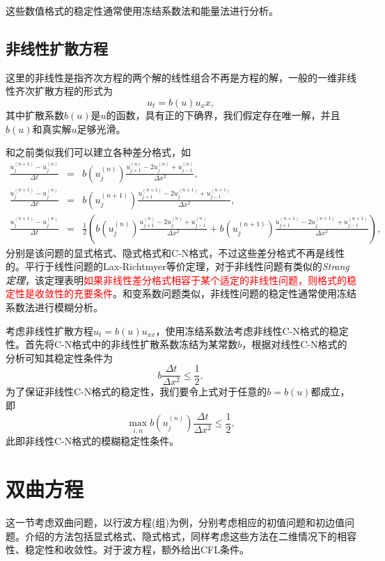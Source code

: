 \documentclass[a4paper,10pt]{ctexart}
\begin{document}
这些数值格式的稳定性通常使用冻结系数法和能量法进行分析。

\subsection{非线性扩散方程}
这里的非线性是指齐次方程的两个解的线性组合不再是方程的解，一般的一维非线性齐次扩散方程的形式为
\begin{equation}
    u_t = b(u)u_xx,
\end{equation}
其中扩散系数$ b(u) $是$ u $的函数，具有正的下确界，我们假定存在唯一解，并且$ b(u) $和真实解$ u $足够光滑。

和之前类似我们可以建立各种差分格式，如
\begin{eqnarray}
    \frac{u^{(n+1)}_j-u^{(n)}_j}{\Delta t} &=& b(u^{(n)}_j)\frac{u^{(n)}_{j+1}-2u^{(n)}_j+u^{(n)}_{j-1}}{\Delta x^2},\\
    \frac{u^{(n+1)}_j-u^{(n)}_j}{\Delta t} &=& b(u^{(n+1)}_j)\frac{u^{(n+1)}_{j+1}-2u^{(n+1)}_j+u^{(n+1)}_{j-1}}{\Delta x^2},\\
    \frac{u^{(n+1)}_j-u^{(n)}_j}{\Delta t} &=& \frac{1}{2}\left( b(u^{(n)}_j)\frac{u^{(n)}_{j+1}-2u^{(n)}_j+u^{(n)}_{j-1}}{\Delta x^2} + b(u^{(n+1)}_j)\frac{u^{(n+1)}_{j+1}-2u^{(n+1)}_j+u^{(n+1)}_{j-1}}{\Delta x^2} \right),
\end{eqnarray}
分别是该问题的显式格式、隐式格式和C-N格式，不过这些差分格式不再是线性的。平行于线性问题的Lax-Richtmyer等价定理，对于非线性问题有类似的\emph{Strang定理}，该定理表明\textcolor{red}{如果非线性差分格式相容于某个适定的非线性问题，则格式的稳定性是收敛性的充要条件}。和变系数问题类似，非线性问题的稳定性通常使用冻结系数法进行模糊分析。

\begin{example}
    考虑非线性扩散方程$ u_t=b(u)u_{xx} $，使用冻结系数法考虑非线性C-N格式的稳定性。首先将C-N格式中的非线性扩散系数冻结为某常数$ b $，根据对线性C-N格式的分析可知其稳定性条件为
    \[
        b \frac{\Delta t}{\Delta x^2} \leqslant \frac{1}{2},
    \]
    为了保证非线性C-N格式的稳定性，我们要令上式对于任意的$ b = b(u) $都成立，即
    \[
        \max_{i,n} b(u_j^{(n)}) \frac{\Delta t}{\Delta x^2} \leqslant \frac{1}{2},
    \]
    此即非线性C-N格式的模糊稳定性条件。
\end{example}

\section{双曲方程}
这一节考虑双曲问题，以行波方程(组)为例，分别考虑相应的初值问题和初边值问题。介绍的方法包括显式格式、隐式格式，同样考虑这些方法在二维情况下的相容性、稳定性和收敛性。对于波方程，额外给出CFL条件。
\end{document}
